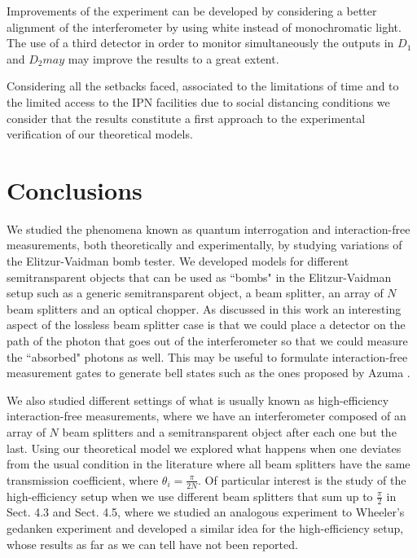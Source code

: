 \documentclass[12pt]{book}
\begin{document}
Improvements of the experiment can be developed by considering a better alignment of the interferometer by using white instead of monochromatic light. The use of a third detector in order to monitor simultaneously the outputs in $D_{1}$ and $D_{2} may$ may improve the results to a great extent.

Considering all the setbacks faced, associated to the limitations of time and to the limited access to the IPN facilities due to social distancing conditions we consider that the results constitute a first approach to the experimental verification of our theoretical models.



\pagebreak


\chapter*{Conclusions}

\pagestyle{plain}

We studied the phenomena known as quantum interrogation and interaction-free measurements, both theoretically and experimentally, by studying variations of the Elitzur-Vaidman bomb tester. We developed models for different semitransparent objects that can be used as ``bombs" in the Elitzur-Vaidman setup such as a generic semitransparent object, a beam splitter, an array of $N$ beam splitters and an optical chopper. As discussed in this work an interesting aspect of the lossless beam splitter case is that we could place a detector on the path of the photon that goes out of the interferometer so that we could measure the ``absorbed" photons as well. This may be useful to formulate interaction-free measurement gates to generate bell states such as the ones proposed by Azuma \cite{computacion}.

We also studied different settings of what is usually known as high-efficiency interaction-free measurements, where we have an interferometer composed of an array of $N$ beam splitters and a semitransparent object after each one but the last. Using our theoretical model we explored what happens when one deviates from the usual condition in the literature where all beam splitters have the same transmission coefficient, where  $\theta_{i}=\frac{\pi}{2N}$. Of particular interest is the study of the high-efficiency setup when we use different beam splitters that sum up to $\frac{\pi}{2}$ in Sect. 4.3 and Sect. 4.5, where we studied an analogous experiment to Wheeler's gedanken experiment \cite{azuri} and developed a similar idea for the high-efficiency setup, whose results as far as we can tell have not been reported.
\end{document}
